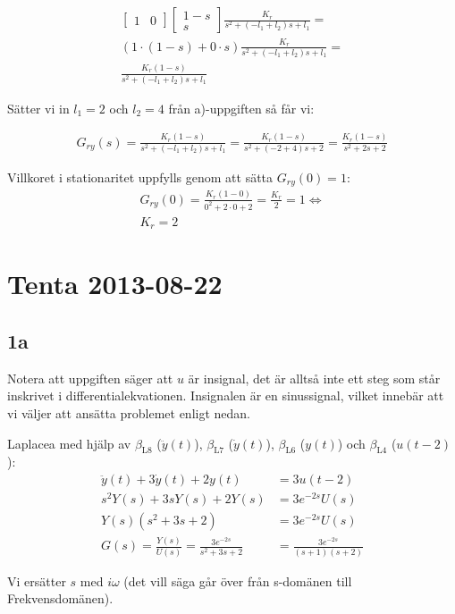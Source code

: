 \documentclass[a4paper]{article}
\newcommand{\mhb}[1]{$\beta_{\text{#1}}$}     %
\begin{document}
\begin{align*}
  \begin{bmatrix}1 & 0\end{bmatrix} \begin{bmatrix}1 - s \\ s\end{bmatrix} \frac{K_r}{s^2 + (-l_1 + l_2)s + l_1} = \\
  (1\cdot(1 - s)+0\cdot s) \frac{K_r}{s^2 + (-l_1 + l_2)s + l_1} = \\
  \frac{K_r(1 - s)}{s^2 + (-l_1 + l_2)s + l_1}
\end{align*}

Sätter vi in $l_1 = 2$ och $l_2 = 4$ från a)-uppgiften så får vi:

\begin{align*}
  G_{ry}(s) = \frac{K_r(1 - s)}{s^2 + (-l_1 + l_2)s + l_1} = \frac{K_r(1 - s)}{s^2 + (-2 + 4)s + 2} = \frac{K_r(1 - s)}{s^2 + 2s + 2}
\end{align*}

Villkoret i stationaritet uppfylls genom att sätta $G_{ry}(0) = 1$:
\begin{align*}
  G_{ry}(0) = \frac{K_r(1 - 0)}{0^2 + 2\cdot 0 + 2} = \frac{K_r}{2} = 1 \Longleftrightarrow\\
  K_r = 2
\end{align*}


\section{Tenta 2013-08-22}
\subsection{1a}
Notera att uppgiften säger att $u$ är insignal, det är alltså inte ett steg som står inskrivet i differentialekvationen. Insignalen är en sinussignal, vilket innebär att vi väljer att ansätta problemet enligt nedan.

Laplacea med hjälp av \mhb{L8} ($\ddot{y}(t)$), \mhb{L7} ($\dot{y}(t)$), \mhb{L6} ($y(t)$) och \mhb{L4} ($u(t - 2)$):
\begin{align*}
  \ddot y(t) + 3 \dot y(t) + 2y(t) &= 3u(t-2)\\
  s^2Y(s) + 3sY(s) + 2Y(s) &= 3e^{-2s}U(s)\\
  Y(s)(s^2 + 3s + 2) &= 3e^{-2s}U(s)\\
  G(s) = \frac{Y(s)}{U(s)} = \frac{3e^{-2s}}{s^2 + 3s + 2} &= \frac{3e^{-2s}}{(s + 1)(s + 2)}
\end{align*}


Vi ersätter $s$ med $i\omega$ (det vill säga går över från s-domänen till Frekvensdomänen).
\end{document}
